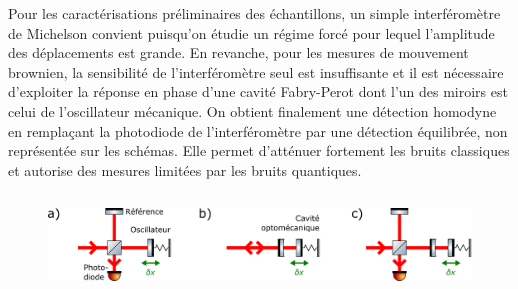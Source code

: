 \documentclass[12pt,a4paper]{article}
\begin{document}
Pour les caractérisations préliminaires des échantillons, un simple interféromètre de Michelson convient puisqu'on étudie un régime forcé pour lequel l'amplitude des déplacements est grande.
En revanche, pour les mesures de mouvement brownien, la sensibilité de l'interféromètre seul est insuffisante et il est nécessaire d'exploiter la réponse en phase d'une cavité Fabry-Perot dont l'un des miroirs est celui de l'oscillateur mécanique.
On obtient finalement une détection homodyne en remplaçant la photodiode de l'interféromètre par une détection équilibrée, non représentée sur les schémas.
Elle permet d'atténuer fortement les bruits classiques et autorise des mesures limitées par les bruits quantiques. 

\begin{figure}
\center
\includegraphics[height=75pt]{figures/detection_scheme.png}


\end{figure}
\end{document}

